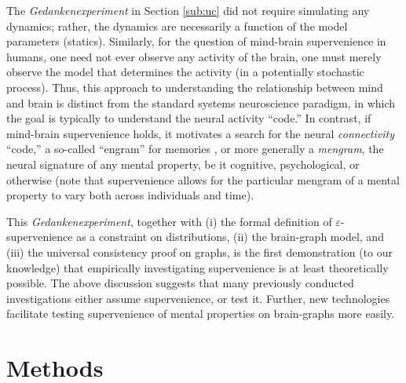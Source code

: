 \documentclass{article}
\begin{document}
The \emph{Gedankenexperiment} in Section \ref{sub:uc} did not require simulating any dynamics; rather, the dynamics are necessarily a function of the model parameters (statics).  Similarly, for the question of mind-brain supervenience in humans, one need not ever observe any activity of the brain, one must merely observe the model that determines the activity (in a potentially stochastic process). Thus, this approach to understanding the relationship between mind and brain is distinct from the standard systems neuroscience paradigm, in which the goal is typically to understand the neural activity ``code.''  In contrast, if mind-brain supervenience holds, it motivates a search for the neural \emph{connectivity} ``code,'' a so-called ``engram''  for memories \cite{Semon21, Lashley50, ZhangLinden03, ShemaDudai07, BerryDavis08}, or more generally a \emph{mengram}, the neural signature of any mental property, be it cognitive, psychological, or otherwise (note that supervenience allows for the particular mengram of a mental property to vary both across individuals and time).  




This \emph{Gedankenexperiment}, together with (i) the formal definition of $\varepsilon$-supervenience as a constraint on distributions, (ii) the brain-graph model, and (iii) the universal consistency proof on graphs, is the first demonstration (to our knowledge) that empirically investigating supervenience is at least theoretically possible. The above discussion suggests that many previously conducted investigations either assume supervenience, or test it.  Further, new technologies facilitate testing supervenience of mental properties on brain-graphs more easily.


\section*{Methods}
\label{sec:methods}

\end{document}
